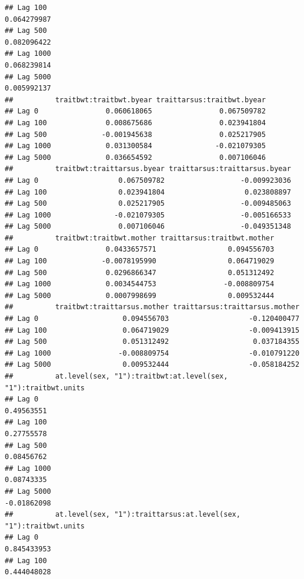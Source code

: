 \documentclass[
  12pt,
]{book}
\begin{document}
\begin{verbatim}
## Lag 100                                                           0.064279987
## Lag 500                                                           0.082096422
## Lag 1000                                                          0.068239814
## Lag 5000                                                          0.005992137
##          traitbwt:traitbwt.byear traittarsus:traitbwt.byear
## Lag 0                0.060618065                0.067509782
## Lag 100              0.008675686                0.023941804
## Lag 500             -0.001945638                0.025217905
## Lag 1000             0.031300584               -0.021079305
## Lag 5000             0.036654592                0.007106046
##          traitbwt:traittarsus.byear traittarsus:traittarsus.byear
## Lag 0                   0.067509782                  -0.009923036
## Lag 100                 0.023941804                   0.023808897
## Lag 500                 0.025217905                  -0.009485063
## Lag 1000               -0.021079305                  -0.005166533
## Lag 5000                0.007106046                  -0.049351348
##          traitbwt:traitbwt.mother traittarsus:traitbwt.mother
## Lag 0                0.0433657571                 0.094556703
## Lag 100             -0.0078195990                 0.064719029
## Lag 500              0.0296866347                 0.051312492
## Lag 1000             0.0034544753                -0.008809754
## Lag 5000             0.0007998699                 0.009532444
##          traitbwt:traittarsus.mother traittarsus:traittarsus.mother
## Lag 0                    0.094556703                   -0.120400477
## Lag 100                  0.064719029                   -0.009413915
## Lag 500                  0.051312492                    0.037184355
## Lag 1000                -0.008809754                   -0.010791220
## Lag 5000                 0.009532444                   -0.058184252
##          at.level(sex, "1"):traitbwt:at.level(sex, "1"):traitbwt.units
## Lag 0                                                       0.49563551
## Lag 100                                                     0.27755578
## Lag 500                                                     0.08456762
## Lag 1000                                                    0.08743335
## Lag 5000                                                   -0.01862098
##          at.level(sex, "1"):traittarsus:at.level(sex, "1"):traitbwt.units
## Lag 0                                                         0.845433953
## Lag 100                                                       0.444048028

\end{verbatim}
\end{document}
